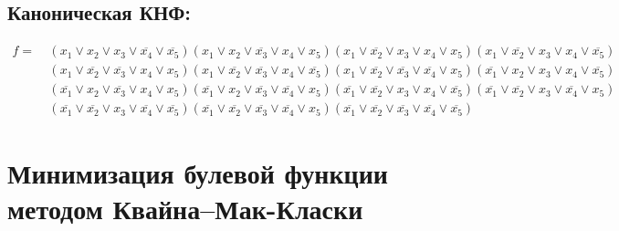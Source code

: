 \documentclass{article}
\begin{document}
\subsection*{Каноническая КНФ:}
\begin{align*}
f =\: &\left(x_{1} \lor x_{2} \lor x_{3} \lor \overline{x_{4}} \lor \overline{x_{5}}\right)\left(x_{1} \lor x_{2} \lor \overline{x_{3}} \lor x_{4} \lor x_{5}\right)\left(x_{1} \lor \overline{x_{2}} \lor x_{3} \lor x_{4} \lor x_{5}\right)\left(x_{1} \lor \overline{x_{2}} \lor x_{3} \lor x_{4} \lor \overline{x_{5}}\right)\\&\left(x_{1} \lor \overline{x_{2}} \lor \overline{x_{3}} \lor x_{4} \lor x_{5}\right)\left(x_{1} \lor \overline{x_{2}} \lor \overline{x_{3}} \lor x_{4} \lor \overline{x_{5}}\right)\left(x_{1} \lor \overline{x_{2}} \lor \overline{x_{3}} \lor \overline{x_{4}} \lor x_{5}\right)\left(\overline{x_{1}} \lor x_{2} \lor x_{3} \lor x_{4} \lor \overline{x_{5}}\right)\\&\left(\overline{x_{1}} \lor x_{2} \lor \overline{x_{3}} \lor x_{4} \lor x_{5}\right)\left(\overline{x_{1}} \lor x_{2} \lor \overline{x_{3}} \lor \overline{x_{4}} \lor x_{5}\right)\left(\overline{x_{1}} \lor \overline{x_{2}} \lor x_{3} \lor x_{4} \lor \overline{x_{5}}\right)\left(\overline{x_{1}} \lor \overline{x_{2}} \lor x_{3} \lor \overline{x_{4}} \lor x_{5}\right)\\&\left(\overline{x_{1}} \lor \overline{x_{2}} \lor x_{3} \lor \overline{x_{4}} \lor \overline{x_{5}}\right)\left(\overline{x_{1}} \lor \overline{x_{2}} \lor \overline{x_{3}} \lor \overline{x_{4}} \lor x_{5}\right)\left(\overline{x_{1}} \lor \overline{x_{2}} \lor \overline{x_{3}} \lor \overline{x_{4}} \lor \overline{x_{5}}\right)\end{align*}
\section*{Минимизация булевой функции методом Квайна--Мак-Класки}
\end{document}
